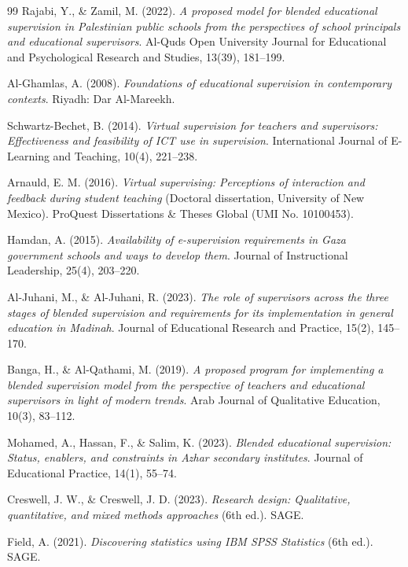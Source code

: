 \documentclass[10pt]{NSP1}
\begin{document}
\begin{thebibliography}{99}
 Rajabi, Y., \& Zamil, M. (2022). \emph{A proposed model for blended educational supervision in Palestinian public schools from the perspectives of school principals and educational supervisors}. Al-Quds Open University Journal for Educational and Psychological Research and Studies, 13(39), 181--199.

 Al-Ghamlas, A. (2008). \emph{Foundations of educational supervision in contemporary contexts}. Riyadh: Dar Al-Mareekh.

 Schwartz-Bechet, B. (2014). \emph{Virtual supervision for teachers and supervisors: Effectiveness and feasibility of ICT use in supervision}. International Journal of E-Learning and Teaching, 10(4), 221--238.

 Arnauld, E. M. (2016). \emph{Virtual supervising: Perceptions of interaction and feedback during student teaching} (Doctoral dissertation, University of New Mexico). ProQuest Dissertations \& Theses Global (UMI No. 10100453).

 Hamdan, A. (2015). \emph{Availability of e-supervision requirements in Gaza government schools and ways to develop them}. Journal of Instructional Leadership, 25(4), 203--220.

 Al-Juhani, M., \& Al-Juhani, R. (2023). \emph{The role of supervisors across the three stages of blended supervision and requirements for its implementation in general education in Madinah}. Journal of Educational Research and Practice, 15(2), 145--170.

 Banga, H., \& Al-Qathami, M. (2019). \emph{A proposed program for implementing a blended supervision model from the perspective of teachers and educational supervisors in light of modern trends}. Arab Journal of Qualitative Education, 10(3), 83--112.

 Mohamed, A., Hassan, F., \& Salim, K. (2023). \emph{Blended educational supervision: Status, enablers, and constraints in Azhar secondary institutes}. Journal of Educational Practice, 14(1), 55--74.

 Creswell, J. W., \& Creswell, J. D. (2023). \emph{Research design: Qualitative, quantitative, and mixed methods approaches} (6th ed.). SAGE.

 Field, A. (2021). \emph{Discovering statistics using IBM SPSS Statistics} (6th ed.). SAGE.

\end{thebibliography}
\end{document}
